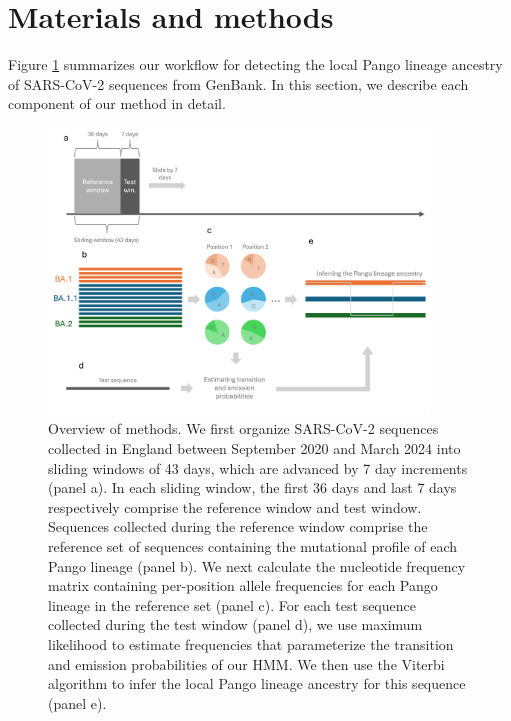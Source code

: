 \documentclass[11pt,oneside,letterpaper]{article}
\begin{document}
\section{Materials and methods}

Figure \ref{fig:method} summarizes our workflow for detecting the local Pango lineage ancestry of SARS-CoV-2 sequences from GenBank. In this section, we describe each component of our method in detail. 

\begin{figure}[H]
  \centering
  \includegraphics[width=0.9\textwidth]{figures/hmm/methods6.png}
  \caption[Overview]{Overview of methods. We first organize SARS-CoV-2 sequences collected in England between September 2020 and March 2024 into sliding windows of 43 days, which are advanced by 7 day increments (panel a). In each sliding window, the first 36 days and last 7 days respectively comprise the reference window and test window. Sequences collected during the reference window comprise the reference set of sequences containing the mutational profile of each Pango lineage (panel b). We next calculate the nucleotide frequency matrix containing per-position allele frequencies for each Pango lineage in the reference set (panel c). For each test sequence collected during the test window (panel d), we use maximum likelihood to estimate frequencies that parameterize the transition and emission probabilities of our HMM. We then use the Viterbi algorithm to infer the local Pango lineage ancestry for this sequence (panel e).}
  \label{fig:method}
\end{figure}

\end{document}
